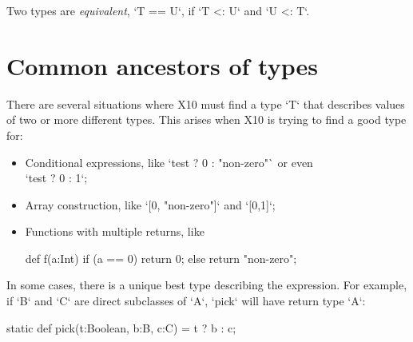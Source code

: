 Two types are {\em equivalent}, \xcd`T == U`, if \xcd`T <: U` and \xcd`U <: T`. 


\section{Common ancestors of types}
\label{LCA}

There are several situations where X10 must find a type \xcd`T` that describes
values of two or more different types.  This arises when X10 is trying to find
a good type for: 
\begin{itemize}
\item Conditional expressions, like \xcd`test ? 0 : "non-zero"` or even \\
      \xcd`test ? 0 : 1`;
\item Array construction, like \xcd`[0, "non-zero"]` and 
      \xcd`[0,1]`;
\item Functions with multiple returns, like
\begin{xten}
def f(a:Int) {
  if (a == 0) return 0;
  else return "non-zero";
}
\end{xten}
\end{itemize}

In some cases, there is a unique best type describing the expression.  For
example, if \xcd`B` and \xcd`C` are direct subclasses of \xcd`A`, \xcd`pick`
will have return type \xcd`A`: 
\begin{xten}
static def pick(t:Boolean, b:B, c:C) = t ? b : c;  
\end{xten}


